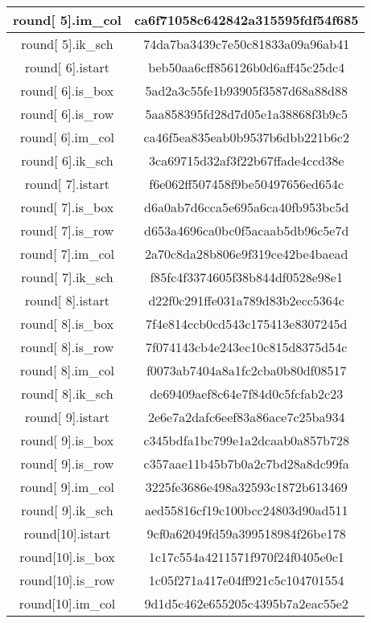 \begin{center}
\begin{longtable}{|c|c|}
\hline
round[ 5].im\_col&   ca6f71058c642842a315595fdf54f685\\
\hline
round[ 5].ik\_sch&   74da7ba3439c7e50c81833a09a96ab41\\
\hline
round[ 6].istart&   beb50aa6cff856126b0d6aff45c25dc4\\
\hline
round[ 6].is\_box&   5ad2a3c55fe1b93905f3587d68a88d88\\
\hline
round[ 6].is\_row&   5aa858395fd28d7d05e1a38868f3b9c5\\
\hline
round[ 6].im\_col&   ca46f5ea835eab0b9537b6dbb221b6c2\\
\hline
round[ 6].ik\_sch&   3ca69715d32af3f22b67ffade4ccd38e\\
\hline
round[ 7].istart&   f6e062ff507458f9be50497656ed654c\\
\hline
round[ 7].is\_box&   d6a0ab7d6cca5e695a6ca40fb953bc5d\\
\hline
round[ 7].is\_row&   d653a4696ca0bc0f5acaab5db96c5e7d\\
\hline
round[ 7].im\_col&   2a70c8da28b806e9f319ce42be4baead\\
\hline
round[ 7].ik\_sch&   f85fc4f3374605f38b844df0528e98e1\\
\hline
round[ 8].istart&   d22f0c291ffe031a789d83b2ecc5364c\\
\hline
round[ 8].is\_box&   7f4e814ccb0cd543c175413e8307245d\\
\hline
round[ 8].is\_row&   7f074143cb4e243ec10c815d8375d54c\\
\hline
round[ 8].im\_col&   f0073ab7404a8a1fc2cba0b80df08517\\
\hline
round[ 8].ik\_sch&   de69409aef8c64e7f84d0c5fcfab2c23\\
\hline
round[ 9].istart&   2e6e7a2dafc6eef83a86ace7c25ba934\\
\hline
round[ 9].is\_box&   c345bdfa1bc799e1a2dcaab0a857b728\\
\hline
round[ 9].is\_row&   c357aae11b45b7b0a2c7bd28a8dc99fa\\
\hline
round[ 9].im\_col&   3225fe3686e498a32593c1872b613469\\
\hline
round[ 9].ik\_sch&   aed55816cf19c100bcc24803d90ad511\\
\hline
round[10].istart&   9cf0a62049fd59a399518984f26be178\\
\hline
round[10].is\_box&   1c17c554a4211571f970f24f0405e0c1\\
\hline
round[10].is\_row&   1c05f271a417e04ff921c5c104701554\\
\hline
round[10].im\_col&   9d1d5c462e655205c4395b7a2eac55e2\\

\end{longtable}
\end{center}
